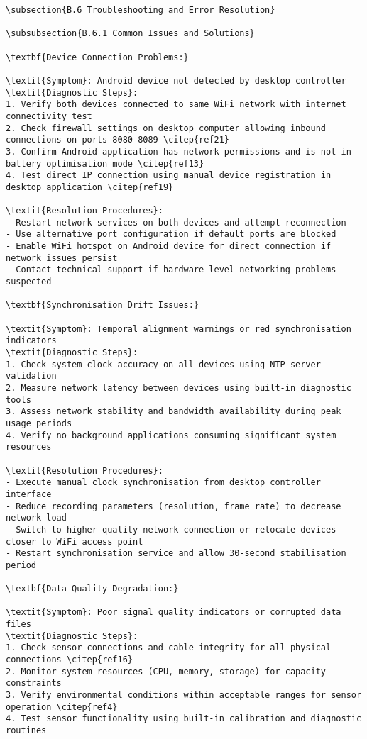 \begin{verbatim}
\subsection{B.6 Troubleshooting and Error Resolution}

\subsubsection{B.6.1 Common Issues and Solutions}

\textbf{Device Connection Problems:}

\textit{Symptom}: Android device not detected by desktop controller
\textit{Diagnostic Steps}:
1. Verify both devices connected to same WiFi network with internet connectivity test
2. Check firewall settings on desktop computer allowing inbound connections on ports 8080-8089 \citep{ref21}
3. Confirm Android application has network permissions and is not in battery optimisation mode \citep{ref13}
4. Test direct IP connection using manual device registration in desktop application \citep{ref19}

\textit{Resolution Procedures}:
- Restart network services on both devices and attempt reconnection
- Use alternative port configuration if default ports are blocked
- Enable WiFi hotspot on Android device for direct connection if network issues persist
- Contact technical support if hardware-level networking problems suspected

\textbf{Synchronisation Drift Issues:}

\textit{Symptom}: Temporal alignment warnings or red synchronisation indicators
\textit{Diagnostic Steps}:
1. Check system clock accuracy on all devices using NTP server validation
2. Measure network latency between devices using built-in diagnostic tools
3. Assess network stability and bandwidth availability during peak usage periods
4. Verify no background applications consuming significant system resources

\textit{Resolution Procedures}:
- Execute manual clock synchronisation from desktop controller interface
- Reduce recording parameters (resolution, frame rate) to decrease network load
- Switch to higher quality network connection or relocate devices closer to WiFi access point
- Restart synchronisation service and allow 30-second stabilisation period

\textbf{Data Quality Degradation:}

\textit{Symptom}: Poor signal quality indicators or corrupted data files
\textit{Diagnostic Steps}:
1. Check sensor connections and cable integrity for all physical connections \citep{ref16}
2. Monitor system resources (CPU, memory, storage) for capacity constraints
3. Verify environmental conditions within acceptable ranges for sensor operation \citep{ref4}
4. Test sensor functionality using built-in calibration and diagnostic routines


\end{verbatim}

